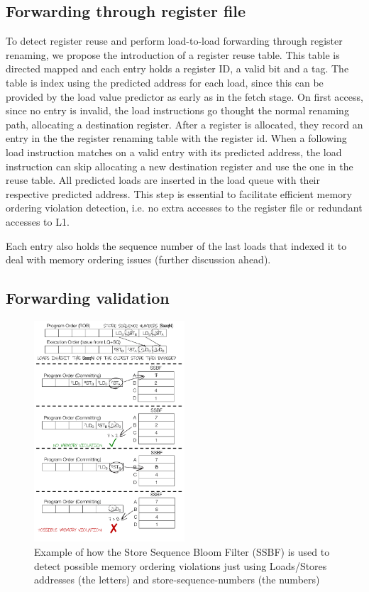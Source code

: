 \documentclass{sig-alternate}
\begin{document}
\subsection{Forwarding through register file}
To detect register reuse and perform load-to-load forwarding through register renaming, we propose the introduction of a register reuse table. This table is directed mapped and each entry holds a register ID, a valid bit and a tag. The table is index using the predicted address for each load, since this can be provided by the load value predictor as early as in the fetch stage. On first access, since no entry is invalid, the load instructions go thought the normal renaming path, allocating a destination register. After a register is allocated, they record an entry in the the register renaming table with the register id. When a following load instruction matches on a valid entry with its predicted address, the load instruction can skip allocating a new destination register and use the one in the reuse table. All predicted loads are inserted in the load queue with their respective predicted address. This step is essential to facilitate efficient memory ordering violation detection, i.e. no extra accesses to the register file or redundant accesses to L1.



Each entry also holds the sequence number of the last loads that indexed it to deal with memory ordering issues (further discussion ahead).

\subsection{Forwarding validation}
\begin{figure}[ht]
\centerline{\includegraphics[width=0.50\textwidth]{diagrams/MemOrdValidation.pdf}}
\caption{Example of how the Store Sequence Bloom Filter (SSBF) is used to detect possible memory ordering violations just using Loads/Stores addresses (the letters) and store-sequence-numbers (the numbers)}
\label{fig:MemOrdValidation}
\end{figure}
\end{document}
